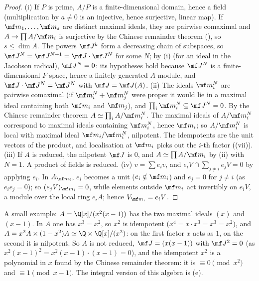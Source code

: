 \begin{proof}
(i) If $P$ is prime, $A/P$ is a finite-dimensional domain, hence a field (multiplication by $a\ne0$ is an injective, hence surjective, linear map).
If $\mf m_1,\dots,\mf m_s$ are distinct maximal ideals, they are pairwise comaximal and $A\to\prod A/\mf m_i$ is surjective by the Chinese remainder theorem
(), so $s\le\dim A$. The powers $\mf J^k$ form a decreasing chain of subspaces, so $\mf J^N=\mf J^{N+1}=\mf J\cdot\mf J^N$ for some $N$; by
(i) (for an ideal in the Jacobson radical), $\mf J^N=0$: its hypotheses hold because $\mf J^N$ is a finite-dimensional
$F$-space, hence a finitely generated $A$-module, and $\mf J\cdot\mf J^N=\mf J^N$ with $\mf J=\mf J(A)$.
(ii) The ideals $\mf m_i^N$ are pairwise comaximal (if $\mf m_i^N+\mf m_j^N$ were proper it would lie in a maximal ideal containing both $\mf m_i$ and $\mf m_j$), and
$\prod_i\mf m_i^N\subseteq\mf J^N=0$. By the Chinese remainder theorem $A\simeq\prod_iA/\mf m_i^N$. The maximal ideals of $A/\mf m_i^N$ correspond to maximal ideals
containing $\mf m_i^N$, hence $\mf m_i$; so $A/\mf m_i^N$ is local with maximal ideal $\mf m_i/\mf m_i^N$, nilpotent. The idempotents are the unit vectors of the
product, and localisation at $\mf m_i$ picks out the $i$-th factor ((vii)).
(iii) If $A$ is reduced, the nilpotent $\mf J$ is $0$, and $A\simeq\prod A/\mf m_i$ by (ii) with $N=1$. A product of fields is reduced.
(iv) $v=\sum e_iv$, and $e_iV\cap\sum_{j\ne i}e_jV=0$ by applying $e_i$. In $A_{\mf m_i}$, $e_i$ becomes a unit ($e_i\notin\mf m_i$) and $e_j=0$ for $j\ne i$ (as
$e_ie_j=0$); so $(e_jV)_{\mf m_i}=0$, while elements outside $\mf m_i$ act invertibly on $e_iV$, a module over the local ring $e_iA$; hence $V_{\mf m_i}=e_iV$.
\end{proof}

A small example: $A=\Q[x]/(x^2(x-1))$ has the two maximal ideals $(x)$ and $(x-1)$. In $A$ one has $x^3=x^2$, so $x^2$ is idempotent
($x^4=x\cdot x^3=x^3=x^2$), and $A=x^2A\times(1-x^2)A\simeq\Q\times\Q[x]/(x^2)$: on the first factor $x$ acts as $1$, on the second it is nilpotent.
So $A$ is not reduced, $\mf J=(x(x-1))$ with $\mf J^2=0$ (as $x^2(x-1)^2=x^2(x-1)\cdot(x-1)=0$), and the idempotent $x^2$ is a polynomial in
$x$ found by the Chinese remainder theorem: it is $\equiv0\pmod{x^2}$ and $\equiv1\pmod{x-1}$. The integral version of this algebra is
(e).

